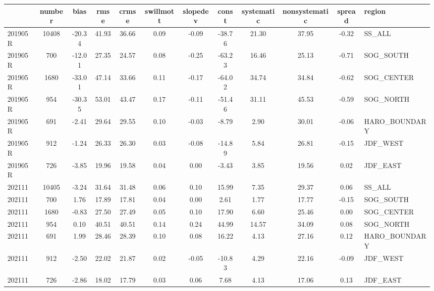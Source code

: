 \begin{tabular}{lccccccccccl}
\toprule
 & number & bias & rmse & crmse & swillmott & slopedev & const & systematic & nonsystematic & spread & region \\
\midrule
201905R & 10408 & -20.34 & 41.93 & 36.66 & 0.09 & -0.09 & -38.76 & 21.30 & 37.95 & -0.32 & SS_ALL \\
201905R & 700 & -12.01 & 27.35 & 24.57 & 0.08 & -0.25 & -63.23 & 16.46 & 25.13 & -0.71 & SOG_SOUTH \\
201905R & 1680 & -33.01 & 47.14 & 33.66 & 0.11 & -0.17 & -64.02 & 34.74 & 34.84 & -0.62 & SOG_CENTER \\
201905R & 954 & -30.35 & 53.01 & 43.47 & 0.17 & -0.11 & -51.46 & 31.11 & 45.53 & -0.59 & SOG_NORTH \\
201905R & 691 & -2.41 & 29.64 & 29.55 & 0.10 & -0.03 & -8.79 & 2.90 & 30.01 & -0.06 & HARO_BOUNDARY \\
201905R & 912 & -1.24 & 26.33 & 26.30 & 0.03 & -0.08 & -14.89 & 5.84 & 26.81 & -0.15 & JDF_WEST \\
201905R & 726 & -3.85 & 19.96 & 19.58 & 0.04 & 0.00 & -3.43 & 3.85 & 19.56 & 0.02 & JDF_EAST \\
202111 & 10405 & -3.24 & 31.64 & 31.48 & 0.06 & 0.10 & 15.99 & 7.35 & 29.37 & 0.06 & SS_ALL \\
202111 & 700 & 1.76 & 17.89 & 17.81 & 0.04 & 0.00 & 2.61 & 1.77 & 17.77 & -0.15 & SOG_SOUTH \\
202111 & 1680 & -0.83 & 27.50 & 27.49 & 0.05 & 0.10 & 17.90 & 6.60 & 25.46 & 0.00 & SOG_CENTER \\
202111 & 954 & 0.10 & 40.51 & 40.51 & 0.14 & 0.24 & 44.99 & 14.57 & 34.09 & 0.08 & SOG_NORTH \\
202111 & 691 & 1.99 & 28.46 & 28.39 & 0.10 & 0.08 & 16.22 & 4.13 & 27.16 & 0.12 & HARO_BOUNDARY \\
202111 & 912 & -2.50 & 22.02 & 21.87 & 0.02 & -0.05 & -10.83 & 4.29 & 22.16 & -0.09 & JDF_WEST \\
202111 & 726 & -2.86 & 18.02 & 17.79 & 0.03 & 0.06 & 7.68 & 4.13 & 17.06 & 0.13 & JDF_EAST \\
\bottomrule
\end{tabular}

